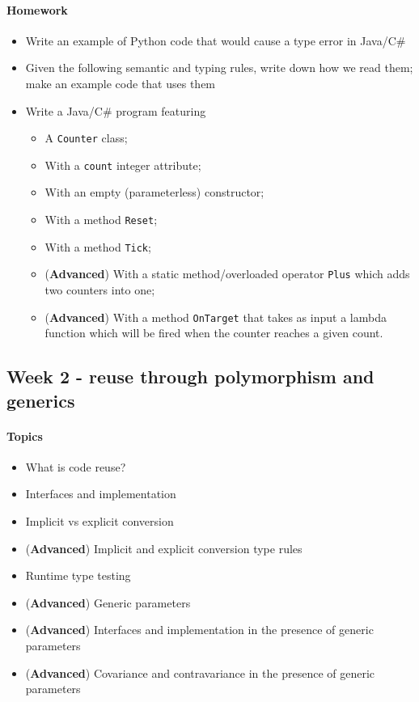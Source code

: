 \documentclass[12pt,a4paper,draft]{article}
\begin{document}
			\paragraph*{Homework}
				\begin{itemize}
					\item Write an example of Python code that would cause a type error in Java/C\#
					\item Given the following semantic and typing rules, write down how we read them; make an example code that uses them
					\item Write a Java/C\# program featuring
					\begin{itemize}
						\item A \texttt{Counter} class;
						\item With a \texttt{count} integer attribute;
						\item With an empty (parameterless) constructor;
						\item With a method \texttt{Reset};
						\item With a method \texttt{Tick};
						\item (\textbf{Advanced}) With a static method/overloaded operator \texttt{Plus} which adds two counters into one;
						\item (\textbf{Advanced}) With a method \texttt{OnTarget} that takes as input a lambda function which will be fired when the counter reaches a given count.
					\end{itemize}
				\end{itemize}
		
		
		\subsection{Week 2 - reuse through polymorphism and generics}
		
		\paragraph*{Topics}
		
		\begin{itemize}
			\item What is code reuse?
			\item Interfaces and implementation
			\item Implicit vs explicit conversion
			\item (\textbf{Advanced}) Implicit and explicit conversion type rules
			\item Runtime type testing
			\item (\textbf{Advanced}) Generic parameters
			\item (\textbf{Advanced}) Interfaces and implementation in the presence of generic parameters
			\item (\textbf{Advanced}) Covariance and contravariance in the presence of generic parameters
		\end{itemize}
		
\end{document}
